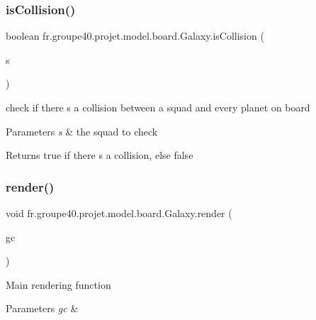\subsubsection{\texorpdfstring{is\+Collision()}{isCollision()}}
{\footnotesize\ttfamily boolean fr.\+groupe40.\+projet.\+model.\+board.\+Galaxy.\+is\+Collision (\begin{DoxyParamCaption}\item[{\mbox{\hyperlink{classfr_1_1groupe40_1_1projet_1_1model_1_1ships_1_1_ship}{Ship}}}]{s }\end{DoxyParamCaption})}



check if there s a collision between a squad and every planet on board 


\begin{DoxyParams}{Parameters}
{\em s} & the squad to check \\
\hline
\end{DoxyParams}
\begin{DoxyReturn}{Returns}
true if there s a collision, else false 
\end{DoxyReturn}
\mbox{\label{classfr_1_1groupe40_1_1projet_1_1model_1_1board_1_1_galaxy_ab3b17b740db263c25b80f7b9e6f33d24}} 
\subsubsection{\texorpdfstring{render()}{render()}}
{\footnotesize\ttfamily void fr.\+groupe40.\+projet.\+model.\+board.\+Galaxy.\+render (\begin{DoxyParamCaption}\item[{Graphics\+Context}]{gc }\end{DoxyParamCaption})}

Main rendering function 
\begin{DoxyParams}{Parameters}
{\em gc} & \\
\hline
\end{DoxyParams}
\mbox{\label{classfr_1_1groupe40_1_1projet_1_1model_1_1board_1_1_galaxy_aa24392147b91b61606b8e8e859ca3e23}} 
